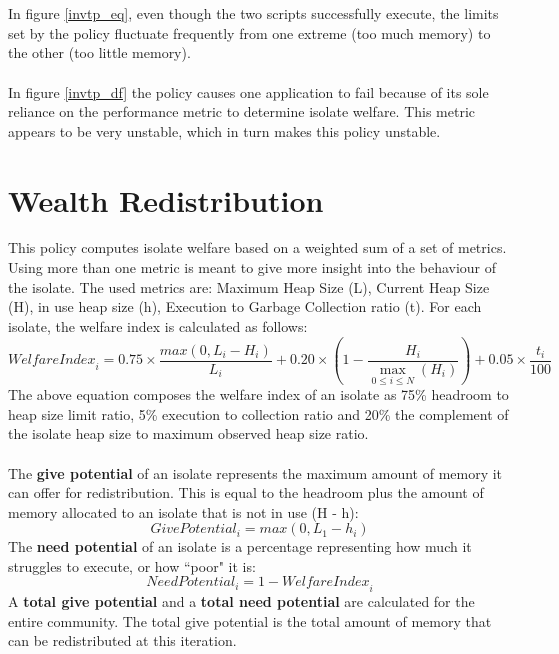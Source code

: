 \documentclass{l4proj}
\begin{document}
\\\\
In figure \ref{invtp_eq}, even though the two scripts successfully execute, the limits set by the policy fluctuate frequently from one extreme (too much memory) to the other (too little memory).
\\\\
In figure \ref{invtp_df} the policy causes one application to fail because of its sole reliance on the performance metric to determine isolate welfare. This metric appears to be very unstable, which in turn makes this policy unstable.

\section{Wealth Redistribution}
This policy computes isolate welfare based on a weighted sum of a set of metrics. Using more than one metric is meant to give more insight into the behaviour of the isolate. The used metrics are:
Maximum Heap Size (L), Current Heap Size (H), in use heap size (h), Execution to Garbage Collection ratio (t). For each isolate, the welfare index is calculated as follows:
\begin{equation}
\textit{WelfareIndex}_i = 0.75\times \dfrac{max\left(0,L_i - H_i\right)}{L_i}+0.20\times \left(1 - \dfrac{H_i}{\max_{0 \leq i \leq N}(H_i)}\right)+0.05\times \dfrac{t_i}{100}
\end{equation}
The above equation composes the welfare index of an isolate as 75\% headroom to heap size limit ratio, 5\% execution to collection ratio and 20\% the complement of the isolate heap size to maximum observed heap size ratio. 
\\\\
The \textbf{give potential} of an isolate represents the maximum amount of memory it can offer for redistribution. This is equal to the headroom plus the amount of memory allocated to an isolate that is not in use (H - h):
\begin{equation}
\textit{GivePotential}_i = max(0,L_1 - h_i)
\end{equation}
The \textbf{need potential} of an isolate is a percentage representing how much it struggles to execute, or how ``poor" it is:
\begin{equation}
\textit{NeedPotential}_i = 1 - \textit{WelfareIndex}_i
\end{equation}
A \textbf{total give potential} and a \textbf{total need potential} are calculated for the entire community. The total give potential is the total amount of memory that can be redistributed at this iteration.
\end{document}
